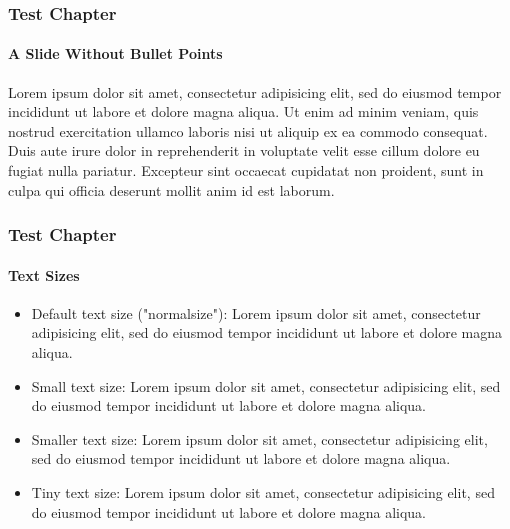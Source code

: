 \begin{frame}
	\frametitle{Test Chapter}
	\framesubtitle{A Slide Without Bullet Points}

	Lorem ipsum dolor sit amet, consectetur adipisicing elit, sed do eiusmod
	tempor incididunt ut labore et dolore magna aliqua. Ut enim ad minim veniam,
	quis nostrud exercitation ullamco laboris nisi ut aliquip ex ea commodo
	consequat. Duis aute irure dolor in reprehenderit in voluptate velit esse
	cillum dolore eu fugiat nulla pariatur. Excepteur sint occaecat cupidatat
	non proident, sunt in culpa qui officia deserunt mollit anim id est laborum.

	\breakingchange

\end{frame}


\begin{frame}
	\frametitle{Test Chapter}
	\framesubtitle{Text Sizes}

	\begin{itemize}
		\item Default text size ("normalsize"):\newline
			Lorem ipsum dolor sit amet, consectetur adipisicing elit, sed do eiusmod tempor incididunt ut labore et dolore magna aliqua.

		\item Small text size:\newline
			\small
				Lorem ipsum dolor sit amet, consectetur adipisicing elit, sed do eiusmod tempor incididunt ut labore et dolore magna aliqua.
			\normalsize

		\item Smaller text size:\newline
			\smaller
				Lorem ipsum dolor sit amet, consectetur adipisicing elit, sed do eiusmod tempor incididunt ut labore et dolore magna aliqua.
			\normalsize

		\item Tiny text size:\newline
			\tiny
				Lorem ipsum dolor sit amet, consectetur adipisicing elit, sed do eiusmod tempor incididunt ut labore et dolore magna aliqua.
			\normalsize

	\end{itemize}
\end{frame}

